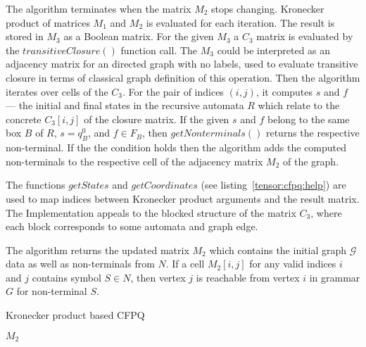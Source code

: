 The algorithm terminates when the matrix $M_2$ stops changing.
Kronecker product of matrices $M_1$ and $M_2$ is evaluated for each iteration.
The result is stored in $M_3$ as a Boolean matrix.
For the given $M_3$ a $C_3$ matrix is evaluated by the $transitiveClosure()$ 
function call. The $M_3$ could be interpreted as an adjacency matrix for an 
directed graph with no labels, used to evaluate transitive closure in terms of 
classical graph definition of this operation.
Then the algorithm iterates over cells of the $C_3$.
For the pair of indices $(i,j)$, it computes $s$ and $f$ --- 
the initial and final states in the recursive automata $R$ which relate 
to the concrete $C_3[i,j]$ of the closure matrix.
If the given $s$ and $f$ belong to the same box $B$ of $R$, $s = q_B^0$, 
and $f \in F_B$, then $getNonterminals()$ returns the respective non-terminal.
If the the condition holds then the algorithm  adds the computed non-terminals 
to the respective cell of the adjacency matrix $M_2$ of the graph.

The functions $getStates$ and $getCoordinates$ (see listing~\ref{tensor:cfpq:help})
are used to map indices between Kronecker product arguments and the result matrix.
The Implementation appeals to the blocked structure of the matrix $C_3$, 
where each block corresponds to some automata and graph edge.

The algorithm returns the updated matrix $M_2$ which contains the initial 
graph $\mathcal{G}$ data as well as non-terminals from $N$.
If a cell $M_2[i,j]$ for any valid indices $i$ and $j$ contains symbol 
$S \in N$, then vertex $j$ is reachable from vertex $i$ in grammar $G$ for 
non-terminal $S$.

\begin{algorithm}[h]
\begin{algorithmic}[1]
\footnotesize
\caption{Kronecker product based CFPQ}
\label{tensor:cfpq}
        \EndFor
    \EndFor
                \EndIf
            \EndIf
        \EndFor
    \EndWhile
\State \Return $M_2$
\EndFunction
\end{algorithmic}
\end{algorithm}

